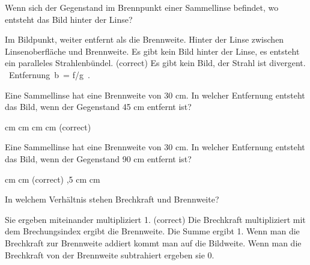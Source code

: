 \documentclass[11pt]{exam}
\begin{document}
\setlength{\voffset}{-0.5in}
\setlength{\headsep}{5pt}

\hspace{2mm}
 \hspace{5mm}
\vspace{4mm}

\begin{questions}

\question Wenn sich der Gegenstand im Brennpunkt einer Sammellinse befindet, wo entsteht das Bild hinter der Linse?

\begin{choices}
	\choice Im Bildpunkt, weiter entfernt als die Brennweite.
	\choice Hinter der Linse zwischen Linsenoberfläche und Brennweite.
	\choice Es gibt kein Bild hinter der Linse, es entsteht ein paralleles Strahlenbündel. (correct)
	\choice Es gibt kein Bild, der Strahl ist divergent.
	\choice  Entfernung b = f/g .
\end{choices}

\vspace{3mm}\question Eine Sammellinse hat eine Brennweite von 30 cm. In welcher Entfernung entsteht das Bild, wenn der Gegenstand 45 cm entfernt ist?

\begin{choices}
	 cm
	 cm
	 cm
	 cm
	\choice 90cm (correct)
\end{choices}

\vspace{3mm}\question Eine Sammellinse hat eine Brennweite von 30 cm. In welcher Entfernung entsteht das Bild, wenn der Gegenstand 90 cm entfernt ist?

\begin{choices}
	 cm
	 cm
	\choice 45cm (correct)
	,5 cm
	 cm
\end{choices}

\vspace{3mm}\question In welchem Verhältnis stehen Brechkraft und Brennweite?

\begin{choices}
	\choice Sie ergeben miteinander multipliziert 1. (correct)
	\choice Die Brechkraft multipliziert mit dem Brechungsindex ergibt die Brennweite.
	\choice Die Summe ergibt 1.
	\choice Wenn man die Brechkraft zur Brennweite addiert kommt man auf die Bildweite.
	\choice Wenn man die Brechkraft von der Brennweite subtrahiert ergeben sie 0.
\end{choices}


\end{questions}
\end{document}
